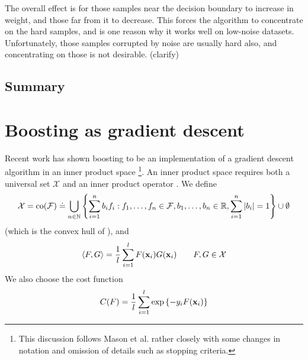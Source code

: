The overall effect is for those samples near the decision boundary to
increase in weight, and those far from it to decrease.  This forces
the algorithm to concentrate on the hard samples, and is one reason
why it works well on low-noise datasets.  Unfortunately, those samples
corrupted by noise are usually hard also, and concentrating on those
is not desirable. (clarify)

\subsection{Summary}


\section{Boosting as gradient descent}
\label{sec:theory:gradient descent}

Recent work has shown boosting to be an implementation of a gradient
descent algorithm in an inner product space
\cite{Mason99}\footnote{This discussion follows Mason et
al. \cite{Mason99} rather closely with some changes in notation and
omission of details such as stopping criteria.}.  An inner product
space requires both a universal set $\mathcal{X}$ and an inner product
operator \ip{\cdot}{\cdot}.  We define
%
\begin{equation}
\mathcal{X} = 
\mathrm{co} (\mathcal{F}) \doteq
 \bigcup _{n \in \mathbb{N}}
\left\{
 \sum_{i=1}^{n}
  b_i
f_i : f_1, \ldots, f_n \in \mathcal{F},
 b_1, \ldots, b_n \in \mathbb{R},
 \sum_{i=1}^{n} | b_i | = 1
\right\} \cup \emptyset
\end{equation}
%
(which is the convex hull of \calF), and
%
\begin{equation}
\langle {F} , {G} \rangle = \frac{1}{l} \sum_{i=1}^{l} F(\mathbf{x}_i)G(\mathbf{x}_i) \qquad
F, G \in \mathcal{X}
\label{eqn:inner product definition}
\end{equation}
%
We also choose the cost function
%
\begin{equation}
C(F) = \frac{1}{l} \sum_{i=1}^{l} \exp
\left\{ -y_i F(\mathbf{x}_i) \right\}
\label{eqn:theory:cost function}
\end{equation}

